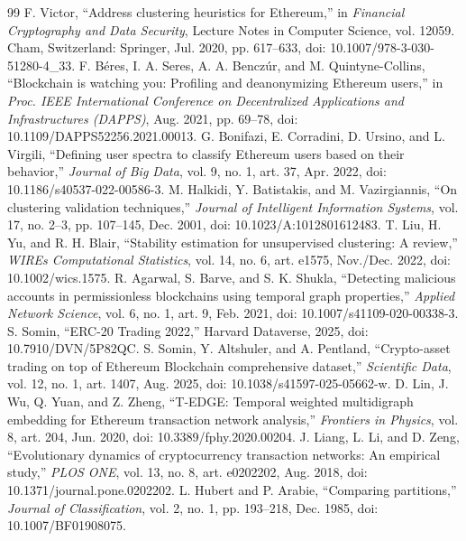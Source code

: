\documentclass[journal,letterpaper]{IEEEtran}
\begin{document}
\begin{doublespace}
\begin{thebibliography}{99}
 F. Victor, ``Address clustering heuristics for Ethereum,'' in \emph{Financial Cryptography and Data Security}, Lecture Notes in Computer Science, vol. 12059. Cham, Switzerland: Springer, Jul. 2020, pp. 617--633, doi: 10.1007/978-3-030-51280-4\_33.
 F. B\'{e}res, I. A. Seres, A. A. Bencz\'{u}r, and M. Quintyne-Collins, ``Blockchain is watching you: Profiling and deanonymizing Ethereum users,'' in \emph{Proc. IEEE International Conference on Decentralized Applications and Infrastructures (DAPPS)}, Aug. 2021, pp. 69--78, doi: 10.1109/DAPPS52256.2021.00013.
 G. Bonifazi, E. Corradini, D. Ursino, and L. Virgili, ``Defining user spectra to classify Ethereum users based on their behavior,'' \emph{Journal of Big Data}, vol. 9, no. 1, art. 37, Apr. 2022, doi: 10.1186/s40537-022-00586-3.
 M. Halkidi, Y. Batistakis, and M. Vazirgiannis, ``On clustering validation techniques,'' \emph{Journal of Intelligent Information Systems}, vol. 17, no. 2--3, pp. 107--145, Dec. 2001, doi: 10.1023/A:1012801612483.
 T. Liu, H. Yu, and R. H. Blair, ``Stability estimation for unsupervised clustering: A review,'' \emph{WIREs Computational Statistics}, vol. 14, no. 6, art. e1575, Nov./Dec. 2022, doi: 10.1002/wics.1575.
 R. Agarwal, S. Barve, and S. K. Shukla, ``Detecting malicious accounts in permissionless blockchains using temporal graph properties,'' \emph{Applied Network Science}, vol. 6, no. 1, art. 9, Feb. 2021, doi: 10.1007/s41109-020-00338-3.
 S. Somin, ``ERC-20 Trading 2022,'' Harvard Dataverse, 2025, doi: 10.7910/DVN/5P82QC.
 S. Somin, Y. Altshuler, and A. Pentland, ``Crypto-asset trading on top of Ethereum Blockchain comprehensive dataset,'' \emph{Scientific Data}, vol. 12, no. 1, art. 1407, Aug. 2025, doi: 10.1038/s41597-025-05662-w.
 D. Lin, J. Wu, Q. Yuan, and Z. Zheng, ``T-EDGE: Temporal weighted multidigraph embedding for Ethereum transaction network analysis,'' \emph{Frontiers in Physics}, vol. 8, art. 204, Jun. 2020, doi: 10.3389/fphy.2020.00204.
 J. Liang, L. Li, and D. Zeng, ``Evolutionary dynamics of cryptocurrency transaction networks: An empirical study,'' \emph{PLOS ONE}, vol. 13, no. 8, art. e0202202, Aug. 2018, doi: 10.1371/journal.pone.0202202.
 L. Hubert and P. Arabie, ``Comparing partitions,'' \emph{Journal of Classification}, vol. 2, no. 1, pp. 193--218, Dec. 1985, doi: 10.1007/BF01908075.

\end{thebibliography}
\end{doublespace}
\end{document}
